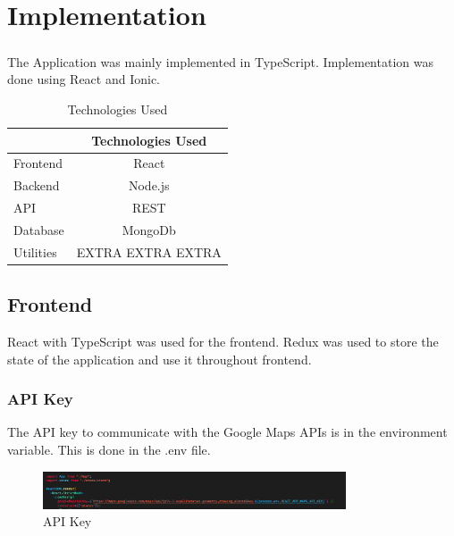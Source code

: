 \chapter{Implementation}

    \paragraph*{}
        The Application was mainly implemented in TypeScript. Implementation was done using React and Ionic.

        \begin{table}[htb]
            \centering
            \begin{tabular}{ | l | c | }
                \hline
                 & Technologies Used \\
                \hline
                \hline
                Frontend & React \\ 
                \hline
                Backend & Node.js \\
                \hline
                API & REST\\
                \hline
                Database & MongoDb\\
                \hline
                Utilities & EXTRA EXTRA EXTRA  \\
                \hline
            \end{tabular}
            \caption{Technologies Used}
            \label{tab:Technologies}
        \end{table}


    \section{Frontend}

    React with TypeScript was used for the frontend. Redux was used to store the state of the application and use it throughout frontend.
        
    \subsection{API Key}
    The API key to communicate with the Google Maps APIs is in the environment variable. This is done in the .env file.
        \begin{figure}[h]
            \centering
            \includegraphics[width=0.8\textwidth]{images/APIkey.png}
            \caption{API Key}
            \label{fig:API}
        \end{figure}


